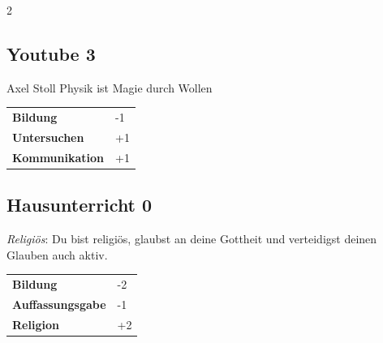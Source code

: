 \begin{multicols}{2}
\begin{tcolorbox}
    \subsection*{Youtube \hfill \small{3 }}
    \tcblower


\begin{pquote}{Axel Stoll}
Physik ist Magie durch Wollen
\end{pquote}

\vspace{3mm}

\begin{tabular}{@{}ll@{}}
    \textbf{Bildung} & -1\\
    \textbf{Untersuchen} & +1\\
    \textbf{Kommunikation} & +1\\
\end{tabular}


\end{tcolorbox}

\begin{tcolorbox}
    \subsection*{Hausunterricht \hfill \small{0 }}
    \tcblower
\textit{Religiös}: Du bist religiös, glaubst an deine Gottheit und verteidigst deinen Glauben auch aktiv.


\vspace{3mm}

\begin{tabular}{@{}ll@{}}
    \textbf{Bildung} & -2\\
    \textbf{Auffassungsgabe} & -1\\
    \textbf{Religion} & +2\\
\end{tabular}



\end{tcolorbox}
\end{multicols}
